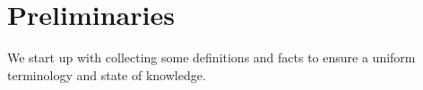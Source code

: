\section{Preliminaries}
\label{sec:preliminaries}

We start up with collecting some definitions and facts to ensure a uniform terminology and state of knowledge.







